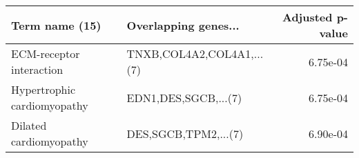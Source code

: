 \begin{tabular}{llr}
\toprule
             Term name (15) &      Overlapping genes... &  Adjusted p-value \\
\midrule
   ECM-receptor interaction & TNXB,COL4A2,COL4A1,...(7) &          6.75e-04 \\
Hypertrophic cardiomyopathy &      EDN1,DES,SGCB,...(7) &          6.75e-04 \\
     Dilated cardiomyopathy &      DES,SGCB,TPM2,...(7) &          6.90e-04 \\
\bottomrule
\end{tabular}
